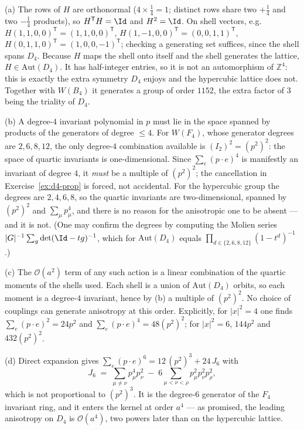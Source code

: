 {(a) The rows of $H$ are orthonormal ($4\times\tfrac14=1$; distinct rows share
two $+\tfrac14$ and two $-\tfrac14$ products), so $H^\mathsf{T}H=\Id$ and
$H^2=\Id$. On shell vectors, e.g.
$H(1,1,0,0)^\mathsf{T}=(1,1,0,0)^\mathsf{T}$,
$H(1,-1,0,0)^\mathsf{T}=(0,0,1,1)^\mathsf{T}$,
$H(0,1,1,0)^\mathsf{T}=(1,0,0,-1)^\mathsf{T}$; checking a generating set
suffices, since the shell spans $D_4$. Because $H$ maps the shell onto itself
and the shell generates the lattice, $H\in\mathrm{Aut}(D_4)$. It has
half-integer entries, so it is not an automorphism of $\mathbb{Z}^4$: this is
exactly the extra symmetry $D_4$ enjoys and the hypercubic lattice does not.
Together with $W(B_4)$ it generates a group of order $1152$, the extra factor of
$3$ being the triality of $D_4$.

(b) A degree-$4$ invariant polynomial in $p$ must lie in the space spanned by
products of the generators of degree $\le 4$. For $W(F_4)$, whose generator
degrees are $2,6,8,12$, the only degree-$4$ combination available is
$(I_2)^2 = (p^2)^2$: the space of quartic invariants is one-dimensional. Since
$\sum_e (p\!\cdot\!e)^4$ is manifestly an invariant of degree $4$, it
\emph{must} be a multiple of $(p^2)^2$; the cancellation in
Exercise~\ref{ex:d4-prop} is forced, not accidental. For the hypercubic group
the degrees are $2,4,6,8$, so the quartic invariants are two-dimensional,
spanned by $(p^2)^2$ and $\sum_\mu p_\mu^4$, and there is no reason for the
anisotropic one to be absent --- and it is not. (One may confirm the degrees by
computing the Molien series
$|G|^{-1}\sum_{g}\det(\Id-tg)^{-1}$, which for $\mathrm{Aut}(D_4)$
equals $\prod_{d\in\{2,6,8,12\}}(1-t^{d})^{-1}$.)

(c) The $\mathcal{O}(a^2)$ term of any such action is a linear combination of
the quartic moments of the shells used. Each shell is a union of
$\mathrm{Aut}(D_4)$ orbits, so each moment is a degree-$4$ invariant, hence by
(b) a multiple of $(p^2)^2$. No choice of couplings can generate anisotropy at
this order. Explicitly, for $|x|^2=4$ one finds $\sum_e (p\!\cdot\!e)^2=24p^2$
and $\sum_e (p\!\cdot\!e)^4=48(p^2)^2$; for $|x|^2=6$, $144p^2$ and
$432(p^2)^2$.

(d) Direct expansion gives
$\sum_e (p\!\cdot\!e)^6 = 12\,(p^2)^3 + 24\,J_6$ with
\begin{equation}
  J_6 \;=\; \sum_{\mu\neq\nu} p_\mu^4 p_\nu^2
        \;-\; 6\!\!\sum_{\mu<\nu<\rho}\!\! p_\mu^2p_\nu^2p_\rho^2 ,
\end{equation}
which is not proportional to $(p^2)^3$. It is the degree-$6$ generator of the
$F_4$ invariant ring, and it enters the kernel at order $a^4$ --- as promised,
the leading anisotropy on $D_4$ is $\mathcal{O}(a^4)$, two powers later than on
the hypercubic lattice.}

